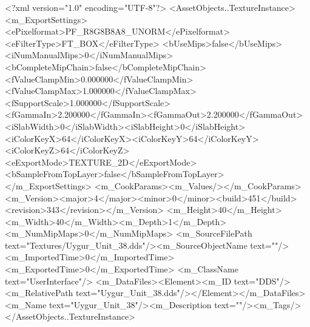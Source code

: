 <?xml version="1.0" encoding="UTF-8"?>
<AssetObjects..TextureInstance>
  <m_ExportSettings>
    <ePixelformat>PF_R8G8B8A8_UNORM</ePixelformat><eFilterType>FT_BOX</eFilterType>
    <bUseMips>false</bUseMips><iNumManualMips>0</iNumManualMips><bCompleteMipChain>false</bCompleteMipChain>
    <fValueClampMin>0.000000</fValueClampMin><fValueClampMax>1.000000</fValueClampMax><fSupportScale>1.000000</fSupportScale>
    <fGammaIn>2.200000</fGammaIn><fGammaOut>2.200000</fGammaOut><iSlabWidth>0</iSlabWidth><iSlabHeight>0</iSlabHeight>
    <iColorKeyX>64</iColorKeyX><iColorKeyY>64</iColorKeyY><iColorKeyZ>64</iColorKeyZ>
    <eExportMode>TEXTURE_2D</eExportMode><bSampleFromTopLayer>false</bSampleFromTopLayer>
  </m_ExportSettings>
  <m_CookParams><m_Values/></m_CookParams>
  <m_Version><major>4</major><minor>0</minor><build>451</build><revision>343</revision></m_Version>
  <m_Height>40</m_Height><m_Width>40</m_Width><m_Depth>1</m_Depth><m_NumMipMaps>0</m_NumMipMaps>
  <m_SourceFilePath text="Textures/Uygur_Unit_38.dds"/><m_SourceObjectName text=""/>
  <m_ImportedTime>0</m_ImportedTime><m_ExportedTime>0</m_ExportedTime>
  <m_ClassName text="UserInterface"/>
  <m_DataFiles><Element><m_ID text="DDS"/><m_RelativePath text="Uygur_Unit_38.dds"/></Element></m_DataFiles>
  <m_Name text="Uygur_Unit_38"/><m_Description text=""/><m_Tags/>
</AssetObjects..TextureInstance>
